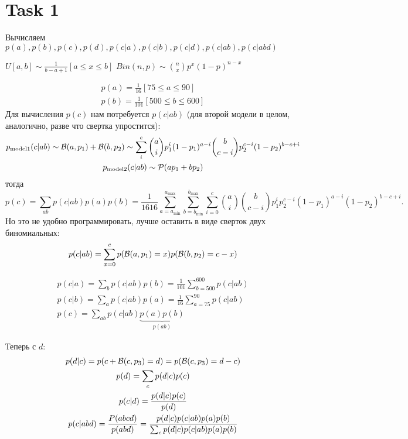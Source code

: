 \section{Task 1}

\begin{task}
    Вычисляем $p(a), p(b), p(c), p(d), p(c|a), p(c|b), p(c|d), p(c|ab), p(c|abd)$
\end{task}

\begin{solution}
    \begin{remark}
        $U[a,b] \sim \frac{1}{b - a + 1}[a \le x \le b]$
        $Bin(n, p) \sim {n \choose x} p^x (1 - p)^{n - x}$
    \end{remark}

    \begin{gather}
        p(a) = \frac{1}{16}[75 \le a \le 90] \\
        p(b) = \frac{1}{101}[500 \le b \le 600]
    \end{gather}
    Для вычисления $p(c)$ нам потребуется $p(c|ab)$ (для второй модели в целом, аналогично, разве что свертка упростится):
    \begin{gather}
        p_{\text{model}1}(c|ab) \sim \mathcal{B}(a, p_1) + \mathcal{B}(b, p_2) \sim \sum_i^c {a \choose i} p_1^i (1 - p_1)^{a - i} {b \choose c - i} p_2^{c - i} (1 - p_2)^{b - c + i} \\
        p_{\text{model}2}(c|ab) \sim \mathcal{P}(ap_1 + bp_2)
    \end{gather}
    тогда
    \begin{equation}
        p(c) = \sum_{ab} p(c|ab)p(a)p(b) = \frac{1}{1616} \sum_{a = a_{\min}}^{a_{\max}} \sum_{b = b_{\min}}^{b_{\max}} \sum_{i = 0}^c {a \choose i} {b \choose c - i} p_1^i p_2^{c - i} (1 - p_1)^{a - i} (1 - p_2)^{b - c + i}.
    \end{equation}
    Но это не удобно программировать, лучше оставить в виде сверток двух биномиальных:
    \begin{equation}
        p(c|ab) = \sum_{x = 0}^c p(\mathcal{B}(a, p_1) = x) p(\mathcal{B}(b, p_2) = c - x)
    \end{equation}

    \begin{gather}
        p(c|a) = \sum_b p(c|ab)p(b) = \frac{1}{101} \sum_{b = 500}^{600} p(c|ab) \\
        p(c|b) = \sum_a p(c|ab)p(a) = \frac{1}{16} \sum_{a = 75}^{90} p(c|ab) \\
        p(c) = \sum_{ab} p(c|ab) \underbrace{p(a)p(b)}_{p(ab)}
    \end{gather}

    Теперь с $d$:
    \begin{gather}
        p(d|c) = p(c + \mathcal{B}(c, p_3) = d) = p(\mathcal{B}(c, p_3) = d - c) \\
        p(d) = \sum_c p(d|c)p(c) \\
        p(c|d) = \frac{p(d|c) p(c)}{p(d)} \\
        p(c|abd) = \frac{P(abcd)}{p(abd)} = \frac{p(d|c) p(c|ab) p(a) p(b)}{\sum_c p(d|c) p(c|ab) p(a) p(b)}
    \end{gather}
\end{solution}
